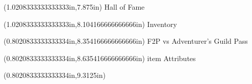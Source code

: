 \documentclass{article}
\begin{document}
\begin{textblock*}{8.0in}(1.0208333333333333in,7.875in)
\fontsize{10.50}{12.60}\selectfont
Hall of Fame
\end{textblock*}
\begin{textblock*}{8.0in}(1.0208333333333333in,8.104166666666666in)
\fontsize{12.75}{15.30}\selectfont
Inventory
\end{textblock*}
\begin{textblock*}{8.0in}(0.8020833333333334in,8.354166666666666in)
\fontsize{10.50}{12.60}\selectfont
F2P vs Adventurer's Guild Pass
\end{textblock*}
\begin{textblock*}{8.0in}(0.8020833333333334in,8.635416666666666in)
\fontsize{10.50}{12.60}\selectfont
item Attributes
\end{textblock*}
\begin{textblock*}{8.0in}(0.8020833333333334in,9.3125in)
\fontsize{10.50}{12.60}
\end{textblock*}
\end{document}
